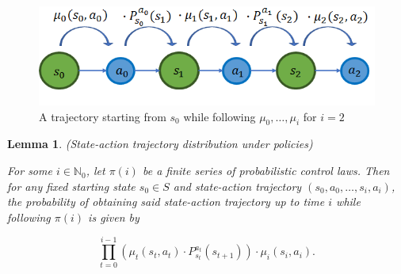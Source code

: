\documentclass[11pt]{article} %
\newtheorem{lem}{Lemma}
\begin{document}
\begin{figure}
  \includegraphics[width=\linewidth]{../graphics/state_action_probs.png}
  \caption{A trajectory starting from $s_0$ while following $\mu_0,\dots,\mu_i$ for $i = 2$}
  \label{fig:boat1}
\end{figure}

\begin{lem}{(State-action trajectory distribution under policies)}\label{lemStateActionControlLawTrajProb}

For some $i \in \mathbb{N}_0$, let $\pi(i)$ be a finite series of probabilistic control laws. Then for any fixed starting state $s_0 \in S$ and state-action trajectory $(s_0,a_0,\dots,s_i,a_i)$, the probability of obtaining said state-action trajectory up to time $i$ while following $\pi(i)$ is given by

\begin{equation}\label{stateActionControlLawTrajProb1}
	\prod_{t=0}^{i-1} \left( \mu_t(s_t,a_t) \cdot P^{a_t}_{s_t}(s_{t+1}) \right) \cdot \mu_i(s_i,a_i).
\end{equation}

\end{lem}
\end{document}
